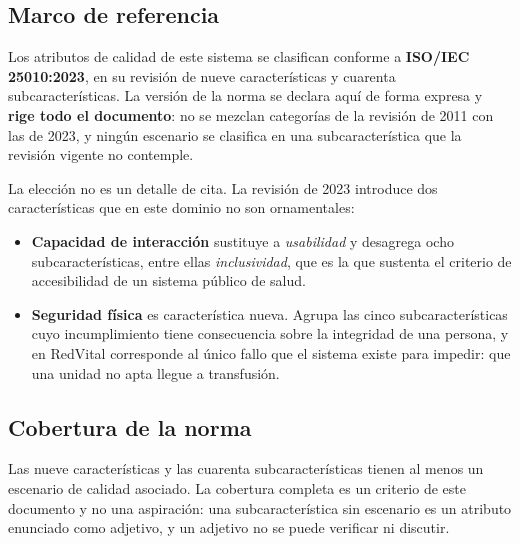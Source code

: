 \documentclass[11pt,a4paper]{article}
\begin{document}
\subsection{Marco de referencia}

Los atributos de calidad de este sistema se clasifican conforme a \textbf{ISO/IEC 25010:2023}, en su revisión de nueve características y cuarenta subcaracterísticas. La versión de la norma se declara aquí de forma expresa y \textbf{rige todo el documento}: no se mezclan categorías de la revisión de 2011 con las de 2023, y ningún escenario se clasifica en una subcaracterística que la revisión vigente no contemple.

La elección no es un detalle de cita. La revisión de 2023 introduce dos características que en este dominio no son ornamentales:

\begin{itemize}
\item \textbf{Capacidad de interacción} sustituye a \emph{usabilidad} y desagrega ocho subcaracterísticas, entre ellas \emph{inclusividad}, que es la que sustenta el criterio de accesibilidad de un sistema público de salud.
\item \textbf{Seguridad física} es característica nueva. Agrupa las cinco subcaracterísticas cuyo incumplimiento tiene consecuencia sobre la integridad de una persona, y en RedVital corresponde al único fallo que el sistema existe para impedir: que una unidad no apta llegue a transfusión.
\end{itemize}

\subsection{Cobertura de la norma}

Las nueve características y las cuarenta subcaracterísticas tienen al menos un escenario de calidad asociado. La cobertura completa es un criterio de este documento y no una aspiración: una subcaracterística sin escenario es un atributo enunciado como adjetivo, y un adjetivo no se puede verificar ni discutir.
\end{document}
